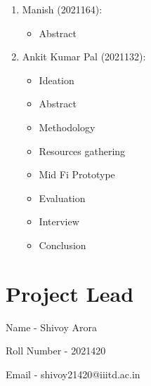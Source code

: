 \documentclass[acmtog]{acmart}
\begin{document}
\begin{enumerate}
    \item Manish (2021164):
    \begin{itemize}
        \item Abstract
    \end{itemize}

    \item Ankit Kumar Pal (2021132):
    \begin{itemize}
        \item Ideation
        \item Abstract
        \item Methodology
        \item Resources gathering
        \item Mid Fi Prototype
        \item Evaluation
        \item Interview
        \item Conclusion
    \end{itemize}
\end{enumerate}

\section*{Project Lead}

\noindent Name - Shivoy Arora

\noindent Roll Number - 2021420

\noindent Email - shivoy21420@iiitd.ac.in
\end{document}
